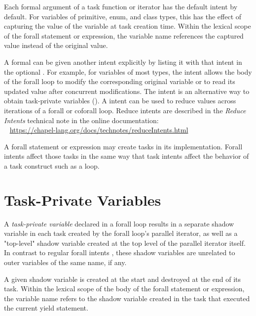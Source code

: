 Each formal argument of a task function or iterator has the default
intent by default.  For variables of primitive, enum, and class
types, this has the effect of capturing the value of the
variable at task creation time.  Within the lexical scope of the
forall statement or expression, the variable name references the
captured value instead of the original value.

A formal can be given another intent explicitly by listing it
with that intent in the optional .
For example, for variables of most types, the  intent allows
the body of the forall loop to modify the corresponding original
variable or to read its updated value after concurrent modifications.
The  intent is an alternative way to obtain task-private
variables ().
A  intent can be used to reduce values across iterations
of a forall or coforall loop.
Reduce intents are described in the \emph{Reduce Intents} technical note
in the online documentation:
\\ %
\mbox{$$ $$ $$} %
\url{https://chapel-lang.org/docs/technotes/reduceIntents.html}

\begin{rationale}
A forall statement or expression may create tasks in its implementation.
Forall intents affect those tasks in the same way that task intents
affect the behavior of a task construct such as a  loop.
\end{rationale}


\section{Task-Private Variables}
\label{Task_Private_Variables}

A \emph{task-private variable} declared in a forall loop results
in a separate shadow variable in each task created by the forall
loop's parallel iterator, as well as a "top-level" shadow variable
created at the top level of the parallel iterator itself.
In contrast to regular forall intents ,
these shadow variables are unrelated to outer variables
of the same name, if any.

A given shadow variable is created at the start and destroyed
at the end of its task.
Within the lexical scope of the body of the forall statement or expression,
the variable name refers to the shadow variable created in the task
that executed the current yield statement.

